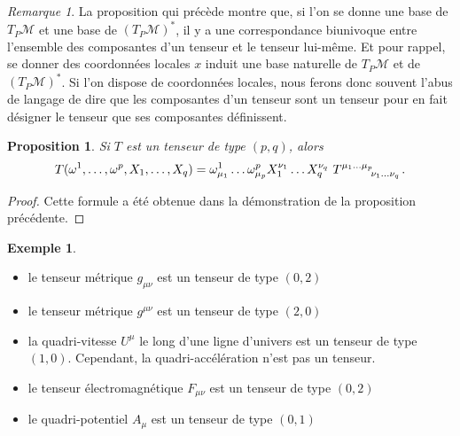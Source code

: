 \documentclass[a4paper,11pt]{report}
\theoremstyle{definition}
\theoremstyle{plain}
\newtheorem{prop}[thm]{Proposition}
\theoremstyle{definition}
\newtheorem{exmp}{Exemple}[chapter]
\theoremstyle{remark}
\newtheorem{rmk}{Remarque}[chapter]
\newcommand{\M}{\mathscr{M}}
\begin{document}
                \begin{rmk}
                    La proposition qui précède montre que, si l'on se donne une base de $T_P\M$ et une base de $(T_P\M)^*$, il y a une correspondance biunivoque entre l'ensemble des composantes d'un tenseur et le tenseur lui-même. Et pour rappel, se donner des coordonnées locales $x$ induit une base naturelle de $T_P\M$ et de $(T_P\M)^*$. Si l'on dispose de coordonnées locales, nous ferons donc souvent l'abus de langage de dire que les composantes d'un tenseur sont un tenseur pour en fait désigner le tenseur que ses composantes définissent.
                \end{rmk}
                
                \begin{prop}
                    Si $T$ est un tenseur de type $(p,q)$, alors
                    \begin{equation}
                        T(\omega^1,\dots,\omega^p,X_1,\dots,X_q) = \omega^1_{\mu_1}\dots\omega^p_{\mu_p}X^{\nu_1}_1\dots X^{\nu_q}_q~ T\indices{^{\mu_1\dots\mu_p}_{\nu_1\dots\nu_q}}.
                    \end{equation}
                \end{prop}
                
                \begin{proof}
                    Cette formule a été obtenue dans la démonstration de la proposition précédente.
                \end{proof}
                
                \begin{exmp}${}$
                    \begin{itemize}[label = \textbullet]
                        \item le tenseur métrique $g_{\mu\nu}$ est un tenseur de type $(0,2)$
                        \item le tenseur métrique $g^{\mu\nu}$ est un tenseur de type $(2,0)$
                        \item la quadri-vitesse $U^{\mu}$ le long d'une ligne d'univers est un tenseur de type $(1,0)$. Cependant, la quadri-accélération n'est pas un tenseur.
                        \item le tenseur électromagnétique $F_{\mu\nu}$ est un tenseur de type $(0,2)$
                        \item le quadri-potentiel $A_{\mu}$ est un tenseur de type $(0,1)$
                    \end{itemize}
                \end{exmp}
                
\end{document}
